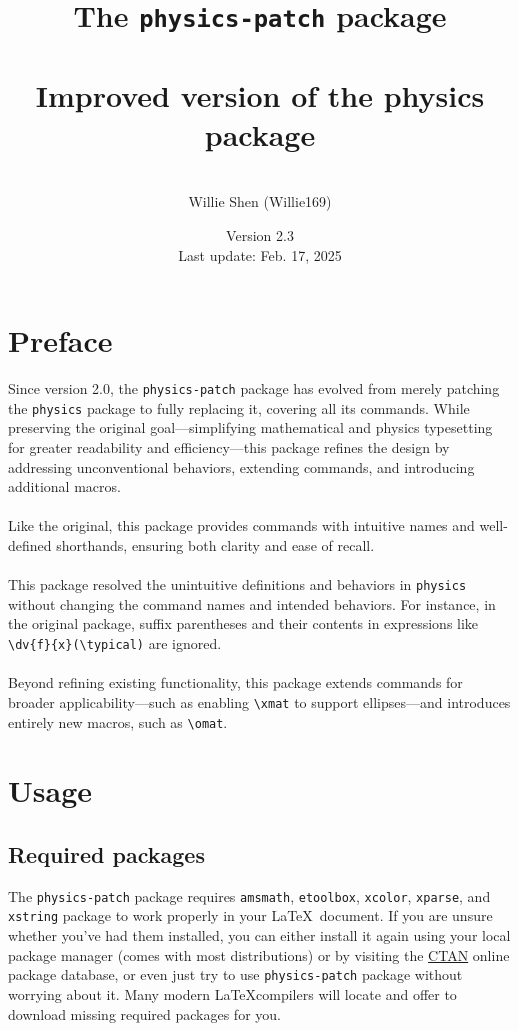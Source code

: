 \documentclass[a4paper,12pt]{article}
\title{The \texttt{physics-patch} package\\\mbox{}\\\textnormal{\large Improved version of the physics package}}
\author{\mbox{}\\Willie Shen (Willie169)}
\date{Version 2.3\\\textnormal{Last update: Feb. 17, 2025}}
\renewcommand{\maketitle}{
\begin{titlepage}
\begin{center}
\vspace*{\fill}
{\huge \bfseries \thetitle\par}
\vskip 1.5em
{\Large \theauthor\par}
\vskip 1em
{\large \thedate\par}
\vspace*{\fill}
\end{center}
\end{titlepage}
}
\begin{document}
\onehalfspacing\thispagestyle{empty}\Needspace{1\textheight}\maketitle\setcounter{page}{1}\Needspace{1\textheight}\tableofcontents\Needspace{1\textheight}\setcounter{page}{1}
\section{Preface}
Since version 2.0, the \texttt{physics-patch} package has evolved from merely patching the \texttt{physics} package to fully replacing it, covering all its commands. While preserving the original goal—simplifying mathematical and physics typesetting for greater readability and efficiency—this package refines the design by addressing unconventional behaviors, extending commands, and introducing additional macros.\\\\
Like the original, this package provides commands with intuitive names and well-defined shorthands, ensuring both clarity and ease of recall.\\\\
This package resolved the unintuitive definitions and behaviors in \texttt{physics} without changing the command names and intended behaviors. For instance, in the original package, suffix parentheses and their contents in expressions like \verb|\dv{f}{x}(\typical)| are ignored.\\\\
Beyond refining existing functionality, this package extends commands for broader applicability—such as enabling \verb|\xmat| to support ellipses—and introduces entirely new macros, such as \verb|\omat|.
\section{Usage}
\subsection{Required packages}
The \texttt{physics-patch} package requires \texttt{amsmath}, \texttt{etoolbox}, \texttt{xcolor}, \texttt{xparse}, and \texttt{xstring} package to work properly in your \LaTeX~document. If you are unsure whether you've had them installed, you can either install it again using your local package manager (comes with most distributions) or by visiting the \href{http://www.ctan.org}{CTAN} online package database, or even just try to use \texttt{physics-patch} package without worrying about it. Many modern \LaTeX compilers will locate and offer to download missing required packages for you.
\end{document}
